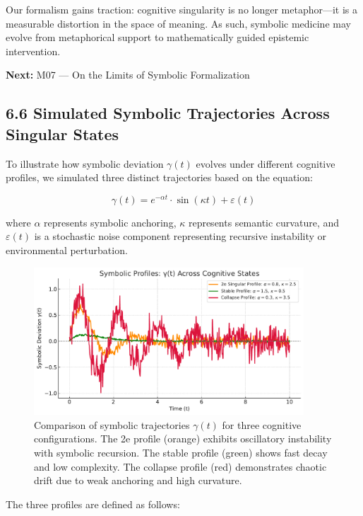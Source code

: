Our formalism gains traction: cognitive singularity is no longer metaphor—it is a measurable distortion in the space of meaning. As such, symbolic medicine may evolve from metaphorical support to mathematically guided epistemic intervention.

\bigskip
\noindent
\textbf{Next:} M07 — On the Limits of Symbolic Formalization


\subsection*{6.6 Simulated Symbolic Trajectories Across Singular States}

To illustrate how symbolic deviation $\gamma(t)$ evolves under different cognitive profiles, we simulated three distinct trajectories based on the equation:

\begin{equation}
\gamma(t) = e^{-\alpha t} \cdot \sin(\kappa t) + \varepsilon(t)
\end{equation}

where $\alpha$ represents symbolic anchoring, $\kappa$ represents semantic curvature, and $\varepsilon(t)$ is a stochastic noise component representing recursive instability or environmental perturbation.

\begin{figure}[H]
\centering
\includegraphics[width=0.9\textwidth]{figs/gamma_profiles_comparison.pdf}
\caption{Comparison of symbolic trajectories $\gamma(t)$ for three cognitive configurations. The 2e profile (orange) exhibits oscillatory instability with symbolic recursion. The stable profile (green) shows fast decay and low complexity. The collapse profile (red) demonstrates chaotic drift due to weak anchoring and high curvature.}
\end{figure}

The three profiles are defined as follows:

